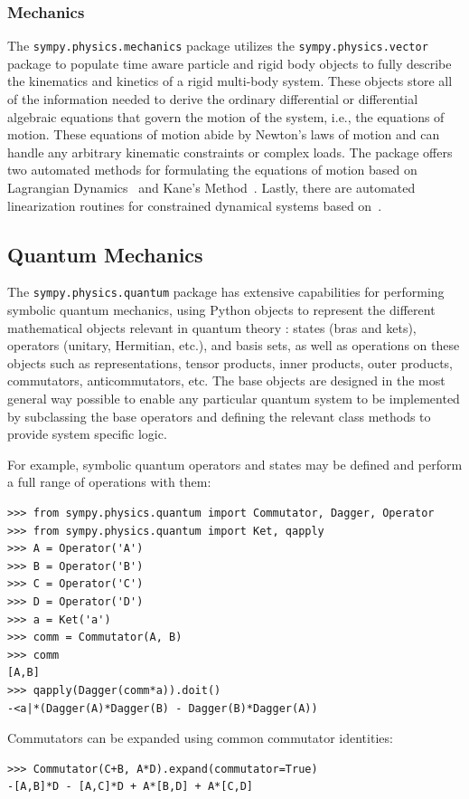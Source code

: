 \subsubsection{Mechanics}

The \verb|sympy.physics.mechanics| package utilizes the \texttt{sympy.\allowbreak{}physics.\allowbreak{}vector} package
to populate time aware particle and rigid body objects to fully describe the
kinematics and kinetics of a rigid multi-body system. These objects store all
of the information needed to derive the ordinary differential or differential
algebraic equations that govern the motion of the system, i.e., the equations
of motion. These equations of motion abide by Newton's laws of motion and can
handle any arbitrary kinematic constraints or complex loads. The package
offers two automated methods for formulating the equations of motion based on
Lagrangian Dynamics~\cite{Lagrange1811} and Kane's Method~\cite{Kane1985}. Lastly, there
are automated linearization routines for constrained dynamical
systems based on~\cite{Peterson2014}.

\subsection{Quantum Mechanics}

The \verb|sympy.physics.quantum| package has extensive capabilities for
performing symbolic quantum mechanics, using Python objects to represent the
different mathematical objects relevant in quantum theory \cite{Sakurai2010}:
states (bras and kets), operators (unitary, Hermitian, etc.), and basis sets, as
well as operations on these objects such as representations, tensor products,
inner products, outer products, commutators, anticommutators, etc. The base
objects are designed in the most general way possible to enable any particular
quantum system to be implemented by subclassing the base operators and defining
the relevant class methods to provide system specific logic.

For example, symbolic quantum operators and states may be defined and perform
a full range of operations with them:
\begin{verbatim}
>>> from sympy.physics.quantum import Commutator, Dagger, Operator
>>> from sympy.physics.quantum import Ket, qapply
>>> A = Operator('A')
>>> B = Operator('B')
>>> C = Operator('C')
>>> D = Operator('D')
>>> a = Ket('a')
>>> comm = Commutator(A, B)
>>> comm
[A,B]
>>> qapply(Dagger(comm*a)).doit()
-<a|*(Dagger(A)*Dagger(B) - Dagger(B)*Dagger(A))
\end{verbatim}
Commutators can be expanded using common commutator identities:
\begin{verbatim}
>>> Commutator(C+B, A*D).expand(commutator=True)
-[A,B]*D - [A,C]*D + A*[B,D] + A*[C,D]
\end{verbatim}

